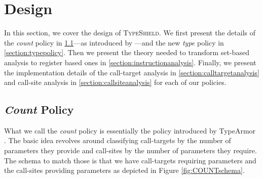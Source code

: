 \section{Design}
\label{chapter:Design}

In this section, we cover the design of \textsc{TypeShield}. We first present the details of the 
\emph{count} policy in \cref{section:countpolicy}---as introduced by \cite{veen:typearmor}---and the
new \emph{type} policy in \cref{section:typepolicy}. 
Then we present the theory needed to transform set-based analysis to register based ones in \cref{section:instructionanalysis}. 
Finally, we present the implementation details of the call-target analysis in 
\cref{section:calltargetanalysis} and call-site analysis in \cref{section:callsiteanalysis} 
for each of our policies. 

\subsection{\emph{Count} Policy}
\label{section:countpolicy}
What we call the \emph{count} policy is essentially the policy introduced by TypeArmor \cite{veen:typearmor}. 
The basic idea revolves around classifying call-targets by the number of parameters they provide and call-sites 
by the number of parameters they require. The schema to match those is that we have call-targets requiring 
parameters and the call-sites providing parameters as depicted in Figure \ref{fig:COUNTschema}.

